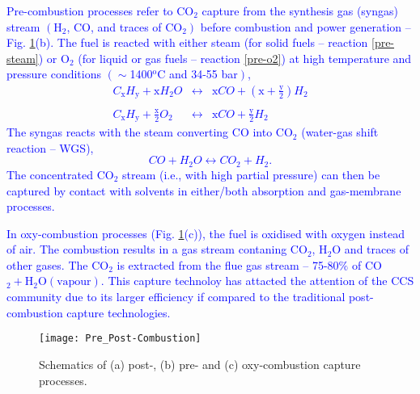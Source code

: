 \documentclass[14pt,twoside]{article}
\begin{document}
\begin{enumerate}
\begin{enumerate}
  \textcolor{blue}{
Pre-combustion processes refer to CO$_{\text{2}}$ capture from the synthesis gas (syngas) stream $\left(\right.$H$_{\text{2}}$, CO, and traces of CO$\left._{\text{2}}\right)$ before combustion and power generation -- Fig. \ref{pic:prepost}(b). The fuel is reacted with either steam (for solid fuels -- reaction \ref{pre-steam}) or O$_{\text{2}}$ (for liquid or gas fuels -- reaction \ref{pre-o2}) at high temperature and pressure conditions $\left(\sim\right.$1400$^{\text{o}}$C and 34-55 bar$\left.\right)$,
\begin{eqnarray}
C_{\text{x}}H_{\text{y}} + \text{x}H_{\text{2}}O &\longleftrightarrow& \text{x}CO + \left(\text{x}+\frac{\text{y}}{2}\right)H_{\text{2}} \label{pre-steam} \\
&& \nonumber \\
C_{\text{x}}H_{\text{y}} + \frac{\text{x}}{2}O_{\text{2}} &\longleftrightarrow& \text{x}CO + \frac{\text{y}}{2}H_{\text{2}} \label{pre-o2}%
\end{eqnarray}
The syngas reacts with the steam converting CO into CO$_{\text{2}}$ (water-gas shift reaction -- WGS),
\begin{equation}
CO + H_{\text{2}}O \longleftrightarrow CO_{\text{2}} + H_{\text{2}}.
\end{equation} 
The concentrated CO$_{\text{2}}$ stream (i.e., with high partial pressure) can then be captured by contact with solvents in either/both absorption and gas-membrane processes. 
}

  \textcolor{blue}{
In oxy-combustion processes (Fig. \ref{pic:prepost}(c)), the fuel is oxidised with oxygen instead of air.  The combustion results in a gas stream contaning CO$_{\text{2}}$, H$_{\text{2}}$O and traces of other gases. The CO$_{\text{2}}$ is extracted from the flue gas stream -- 75-80$\%$ of CO$_{\text{2}}+\text{H}_{\text{2}}\text{O}\left(\text{vapour}\right)$. This capture technoloy has attacted the attention of the CCS community due to its larger efficiency if compared to the traditional post-combustion capture technologies.}

\begin{figure}[h]
\begin{center}
\texttt{[image: Pre\_Post-Combustion]}
\caption{Schematics of (a) post-, (b) pre- and (c) oxy-combustion capture processes.}\label{pic:prepost}
\end{center}
\end{figure}


\end{enumerate}
\end{enumerate}
\end{document}
